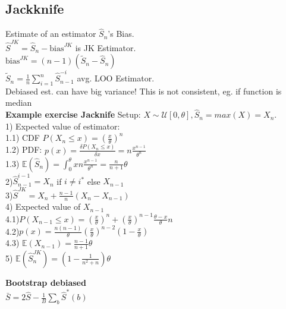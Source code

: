 \subsection*{Jackknife}
Estimate of an estimator $\hat{S}_n$'s Bias.\\
$\hat{S}^{JK}=\hat{S}_n-\mathrm{bias}^{JK}$ is JK Estimator.\\
$\mathrm{bias}^{JK}{=}(n{-}1)(\tilde{S}_n{-}\hat{S}_n)$\\
$\tilde{S}_n{=}\frac{1}{n}\sum_{i=1}^n\hat{S}_{n{-}1}^{-i}$ avg. LOO Estimator. \\
Debiased est. can have big variance! This is not consistent, eg. if function is median\\
\textbf{Example exercise Jacknife}
Setup: $X \sim \mathcal{U}[0, \theta], \hat S_n = max(X) = X_n$. \\
1) Expected value of estimator: \\
1.1) CDF $P(X_n \leq x) = (\frac{x}{\theta})^n$ \\
1.2) PDF: $p(x) = \frac{\delta P(X_n \leq x)}{\delta x} = n \frac{x^{n-1}}{\theta^n}$ \\
1.3) $\mathbb{E}(\hat S_n) = \int_0^\theta x n \frac{x^{n-1}}{\theta^n} = \frac{n}{n+1}\theta$ \\
2)$\hat S_{n-1}^{i-1} = X_n$ if $i \neq i^*$ else $X_{n-1}$\\
3)$\hat S^{JK} = X_n+\frac{n-1}{n}(X_n - X_{n-1})$ \\
4) Expected value of $X_{n-1}$ \\
4.1)$P(X_{n-1} \leq x) = (\frac{x}{\theta})^n + (\frac{x}{\theta})^{n-1}\frac{\theta-x}{\theta}n$ \\
4.2)$p(x) = \frac{n(n-1)}{\theta}(\frac{x}{\theta})^{n-2}(1-\frac{x}{\theta})$\\
4.3) $\mathbb{E}(X_{n-1})= \frac{n-1}{n+1}\theta$ \\
5) $\mathbb{E}(\hat S_n^{JK}) = (1-\frac{1}{n^2+n})\theta$


\textbf{Bootstrap debiased}\\ $\bar{S}{=}2\hat{S}{-}\frac{1}{B}\sum_b\hat{S}^*(b)$
%

